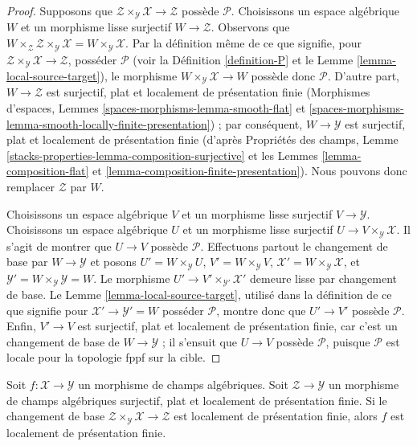 \begin{proof}
Supposons que
$\mathcal{Z} \times_\mathcal{Y} \mathcal{X} \to \mathcal{Z}$ possède
$\mathcal{P}$. Choisissons un espace algébrique $W$ et un morphisme lisse
surjectif $W \to \mathcal{Z}$. Observons que
$W \times_\mathcal{Z} \mathcal{Z} \times_\mathcal{Y} \mathcal{X} =
W \times_\mathcal{Y} \mathcal{X}$. Par la définition même de ce que signifie,
pour $\mathcal{Z} \times_\mathcal{Y} \mathcal{X} \to \mathcal{Z}$, posséder
$\mathcal{P}$ (voir la
Définition \ref{definition-P} et le Lemme \ref{lemma-local-source-target}),
le morphisme $W \times_\mathcal{Y} \mathcal{X} \to W$ possède donc
$\mathcal{P}$. D'autre part, $W \to \mathcal{Z}$ est surjectif, plat et
localement de présentation finie (Morphismes d'espaces, Lemmes
\ref{spaces-morphisms-lemma-smooth-flat} et
\ref{spaces-morphisms-lemma-smooth-locally-finite-presentation}) ; par
conséquent, $W \to \mathcal{Y}$ est surjectif, plat et localement de
présentation finie (d'après Propriétés des champs, Lemme
\ref{stacks-properties-lemma-composition-surjective}
et les Lemmes \ref{lemma-composition-flat} et
\ref{lemma-composition-finite-presentation}). Nous pouvons donc remplacer
$\mathcal{Z}$ par $W$.

\medskip\noindent
Choisissons un espace algébrique $V$ et un morphisme lisse surjectif
$V \to \mathcal{Y}$. Choisissons un espace algébrique $U$ et un morphisme
lisse surjectif $U \to V \times_\mathcal{Y} \mathcal{X}$. Il s'agit de
montrer que $U \to V$ possède $\mathcal{P}$. Effectuons partout le changement
de base par $W \to \mathcal{Y}$ et posons
$U' = W \times_\mathcal{Y} U$,
$V' = W \times_\mathcal{Y} V$,
$\mathcal{X}' = W \times_\mathcal{Y} \mathcal{X}$,
et $\mathcal{Y}' = W \times_\mathcal{Y} \mathcal{Y} = W$. Le morphisme
$U' \to V' \times_{\mathcal{Y}'} \mathcal{X}'$ demeure lisse par changement
de base. Le Lemme \ref{lemma-local-source-target}, utilisé dans la définition
de ce que signifie pour $\mathcal{X}' \to \mathcal{Y}' = W$ posséder
$\mathcal{P}$, montre donc que $U' \to V'$ possède
$\mathcal{P}$. Enfin, $V' \to V$ est surjectif, plat et localement de
présentation finie, car c'est un changement de base de
$W \to \mathcal{Y}$ ; il s'ensuit que $U \to V$ possède $\mathcal{P}$,
puisque $\mathcal{P}$ est locale pour la topologie fppf sur la cible.
\end{proof}

\begin{lemma}
\label{lemma-descent-finite-presentation}
Soit $f : \mathcal{X} \to \mathcal{Y}$ un morphisme de champs algébriques.
Soit $\mathcal{Z} \to \mathcal{Y}$ un morphisme de champs algébriques
surjectif, plat et localement de présentation finie. Si le changement de base
$\mathcal{Z} \times_\mathcal{Y} \mathcal{X} \to \mathcal{Z}$
est localement de présentation finie, alors $f$ est localement de présentation
finie.
\end{lemma}

